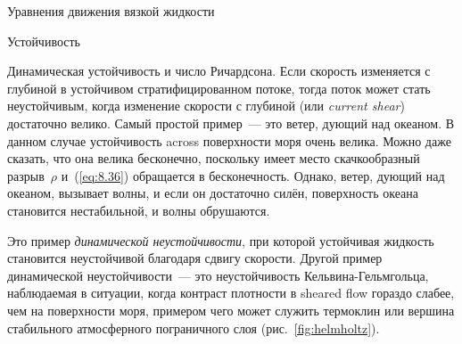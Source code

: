 \begin{chapter}{Уравнения движения вязкой жидкости}
\begin{section}{Устойчивость}
\begin{paragraph}{Динамическая устойчивость и число Ричардсона.}
Если скорость изменяется с глубиной в устойчивом стратифицированном
потоке, тогда поток может стать неустойчивым, когда изменение скорости с
глубиной (или \textit{current shear})
достаточно велико. Самый простой пример~--- это ветер, дующий над океаном. 
В данном случае устойчивость across поверхности моря очень велика. 
Можно даже сказать, что она велика бесконечно, поскольку имеет место 
скачкообразный разрыв~$\rho$ и~(\ref{eq:8.36}) обращается в бесконечность.
Однако, ветер, дующий над океаном, вызывает волны, и если он достаточно силён,
поверхность океана становится нестабильной, и волны обрушаются.
%

Это пример 
\emph{динамической неустойчивости}, 
при которой устойчивая жидкость становится неустойчивой благодаря сдвигу 
скорости. Другой пример динамической неустойчивости~--- это неустойчивость
Кельвина-Гельмгольца, наблюдаемая в ситуации, когда контраст плотности
в sheared flow гораздо слабее, чем на поверхности моря, примером чего может
служить термоклин или вершина стабильного атмосферного 
пограничного слоя (рис.~\ref{fig:helmholtz}).
%


\end{paragraph}
\end{section}
\end{chapter}

